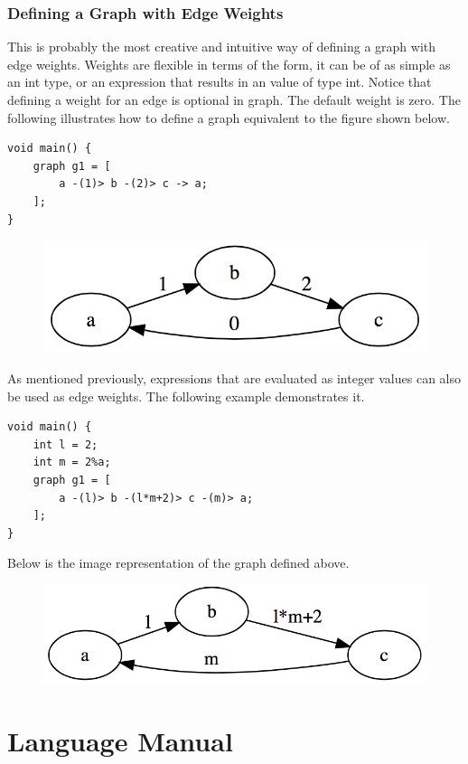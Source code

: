 \documentclass[a4paper,12pt]{article}
\begin{document}
\subsubsection{Defining a Graph with Edge Weights}
This is probably the most creative and intuitive way of defining a graph with edge weights. Weights are flexible in terms of the form, it can be of as simple as an int type, or an expression that results in an value of type int. Notice that defining a weight for an edge is optional in graph. The default weight is zero. The following illustrates how to define a graph equivalent to the figure shown below.
\begin{lstlisting}
void main() {
	graph g1 = [
		a -(1)> b -(2)> c -> a;
	];
}
\end{lstlisting}

\begin{figure}[h]
	\centering
	\includegraphics[scale=0.5]{a-(1)>b-(2)>c->a.png}
\end{figure}

As mentioned previously, expressions that are evaluated as integer values can also be used as edge weights. The following example demonstrates it.
\begin{lstlisting}
void main() {
	int l = 2;
	int m = 2%a;
	graph g1 = [
		a -(l)> b -(l*m+2)> c -(m)> a;
	];
}
\end{lstlisting}
Below is the image representation of the graph defined above.
\begin{figure}[h]
	\centering
	\includegraphics[scale=0.5]{expr_as_weight.png}
\end{figure}

\section{Language Manual}
\end{document}
